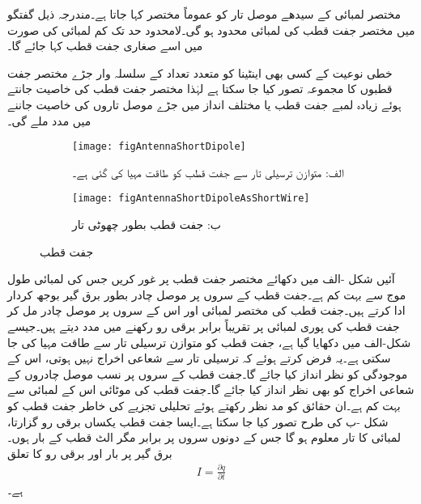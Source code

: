 
مختصر لمبائی کے سیدھے موصل تار کو عموماً مختصر  کہا جاتا ہے۔مندرجہ ذیل گفتگو میں مختصر جفت قطب کی لمبائی محدود ہو گی۔لامحدود حد تک کم لمبائی کی صورت میں اسے صغاری جفت قطب کہا جائے گا۔

خطی نوعیت کے کسی بھی اینٹینا کو متعدد تعداد کے سلسلہ وار جڑے مختصر جفت قطبوں کا مجموعہ تصور کیا جا سکتا ہے لہٰذا مختصر جفت قطب کی خاصیت جانتے ہوئے زیادہ لمبے جفت قطب یا مختلف انداز میں جڑے موصل  تاروں کی خاصیت جاننے میں مدد ملے گی۔ 

\begin{figure}
\centering
\begin{subfigure}{0.5\textwidth}
\centering
\texttt{[image: figAntennaShortDipole]}
\caption*{الف: متوازن ترسیلی تار سے جفت قطب کو طاقت مہیا کی گئی ہے۔}
\end{subfigure}%
%
\begin{subfigure}{0.5\textwidth}
\centering
\texttt{[image: figAntennaShortDipoleAsShortWire]}
\caption*{ب: جفت قطب بطور چھوٹی تار}
\end{subfigure}%
\caption{جفت قطب}
\label{شکل_اینٹینا_جفت_قطب}
\end{figure}



آئیں شکل -الف میں دکھائے مختصر جفت قطب پر غور کریں جس کی لمبائی  طول موج سے بہت کم  ہے۔جفت قطب کے سروں پر موصل چادر بطور  برق گیر   بوجھ کردار ادا کرتے ہیں۔جفت قطب کی مختصر لمبائی اور اس کے سروں پر موصل چادر مل کر جفت قطب  کی پوری لمبائی پر تقریباً برابر برقی رو رکھنے میں مدد دیتے ہیں۔جیسے شکل-الف میں دکھایا گیا ہے، جفت قطب کو متوازن ترسیلی تار سے طاقت مہیا کی جا سکتی ہے۔یہ فرض کرتے ہوئے کہ ترسیلی تار سے شعاعی اخراج نہیں ہوتی، اس کے موجودگی کو نظر انداز کیا جائے گا۔جفت قطب کے سروں پر نسب موصل چادروں کے شعاعی اخراج کو بھی نظر انداز کیا جائے گا۔جفت قطب کی موٹائی  اس کے لمبائی سے بہت کم  ہے۔ان حقائق کو مد نظر رکھتے ہوئے تحلیلی تجزیے کی خاطر جفت قطب کو شکل -ب کی طرح تصور کیا جا سکتا ہے۔ایسا جفت قطب یکساں برقی رو  گزارتا،  لمبائی کا تار معلوم ہو گا جس کے دونوں سروں پر برابر مگر الٹ قطب کے بار  ہوں۔برق گیر  پر بار  اور برقی رو  کا تعلق
\begin{align}\label{مساوات_اینٹینا_رو_اور_بار}
I=\frac{\partial q}{\partial t}
\end{align}
ہے۔ 

